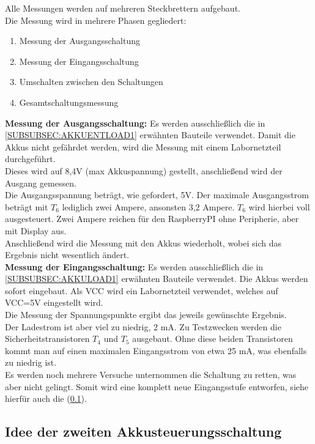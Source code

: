 \documentclass[12pt,a4paper]{article}
\begin{document}
Alle Messungen werden auf mehreren Steckbrettern aufgebaut. \\
Die Messung wird in mehrere Phasen gegliedert:
\begin{enumerate}
	\item{Messung der Ausgangsschaltung}
	\item{Messung der Eingangsschaltung}
	\item{Umschalten zwischen den Schaltungen}
	\item{Gesamtschaltungsmessung}
\end{enumerate}
\textbf{Messung der Ausgangsschaltung:}  Es werden ausschließlich die in \ref{SUBSUBSEC:AKKUENTLOAD1} erwähnten Bauteile verwendet. Damit die Akkus nicht gefährdet werden, wird die Messung mit einem Labornetzteil durchgeführt. \\
Dieses wird auf 8,4V (max Akkuspannung) gestellt, anschließend wird der Ausgang gemessen. \\
Die Ausgangsspannung beträgt, wie gefordert, 5V.
Der maximale Ausgangsstrom beträgt mit $T_6$ lediglich zwei Ampere, ansonsten 3,2 Ampere. $T_6$ wird hierbei voll ausgesteuert. Zwei Ampere reichen für den RaspberryPI ohne Peripherie, aber mit Display aus. \\
Anschließend wird die Messung mit den Akkus wiederholt, wobei sich das Ergebnis nicht wesentlich ändert.\\[2ex]
\textbf{Messung der Eingangsschaltung:} Es werden ausschließlich die in \ref{SUBSUBSEC:AKKULOAD1} erwähnten Bauteile verwendet. Die Akkus werden sofort eingebaut. Als VCC wird ein Labornetzteil verwendet, welches auf VCC=5V eingestellt wird. \\
Die Messung der Spannungspunkte ergibt das jeweils gewünschte Ergebnis. \\
Der Ladestrom ist aber viel zu niedrig, 2 mA. Zu Testzwecken werden die Sicherheitstransistoren $T_4$ und $T_5$ ausgebaut. Ohne diese beiden Transistoren kommt man auf einen maximalen Eingangsstrom von etwa 25 mA, was ebenfalls zu niedrig ist. \\
Es werden noch mehrere Versuche unternommen die Schaltung zu retten, was aber nicht gelingt. Somit wird eine komplett neue Eingangsstufe entworfen, siehe hierfür auch die (\ref{SUBSEC:AKKUSTEUR2}).

\newpage
\subsection{Idee der zweiten Akkusteuerungsschaltung}
\label{SUBSEC:AKKUSTEUR2}
\end{document}
